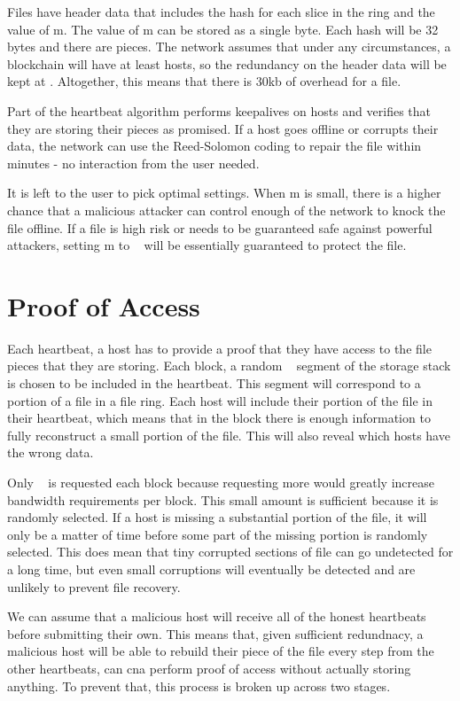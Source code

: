 \documentclass[twocolumn]{article}
\begin{document}
Files have header data that includes the hash for each slice in the ring and the value of m.
The value of m can be stored as a single byte.
Each hash will be 32 bytes and there are \numhosts pieces.
The network assumes that under any circumstances, a blockchain will have at least \inversemaxcorruption hosts, so the redundancy on the header data will be kept at \maxredundancy.
Altogether, this means that there is 30kb of overhead for a file.

Part of the heartbeat algorithm performs keepalives on hosts and verifies that they are storing their pieces as promised.
If a host goes offline or corrupts their data, the network can use the Reed-Solomon coding to repair the file within minutes - no interaction from the user needed.

It is left to the user to pick optimal settings.
When m is small, there is a higher chance that a malicious attacker can control enough of the network to knock the file offline.
If a file is high risk or needs to be guaranteed safe against powerful attackers, setting m to \minuncorruptedhosts ~ will be essentially guaranteed to protect the file.

\section{Proof of Access}

Each heartbeat, a host has to provide a proof that they have access to the file pieces that they are storing.
Each block, a random \filechecksize ~ segment of the storage stack is chosen to be included in the heartbeat.
This segment will correspond to a portion of a file in a file ring.
Each host will include their portion of the file in their heartbeat, which means that in the block there is enough information to fully reconstruct a small portion of the file.
This will also reveal which hosts have the wrong data.

Only \filechecksize ~ is requested each block because requesting more would greatly increase bandwidth requirements per block.
This small amount is sufficient because it is randomly selected.
If a host is missing a substantial portion of the file, it will only be a matter of time before some part of the missing portion is randomly selected.
This does mean that tiny corrupted sections of file can go undetected for a long time, but even small corruptions will eventually be detected and are unlikely to prevent file recovery.

We can assume that a malicious host will receive all of the honest heartbeats before submitting their own.
This means that, given sufficient redundnacy, a malicious host will be able to rebuild their piece of the file every step from the other heartbeats, can cna perform proof of access without actually storing anything.
To prevent that, this process is broken up across two stages.
\end{document}
